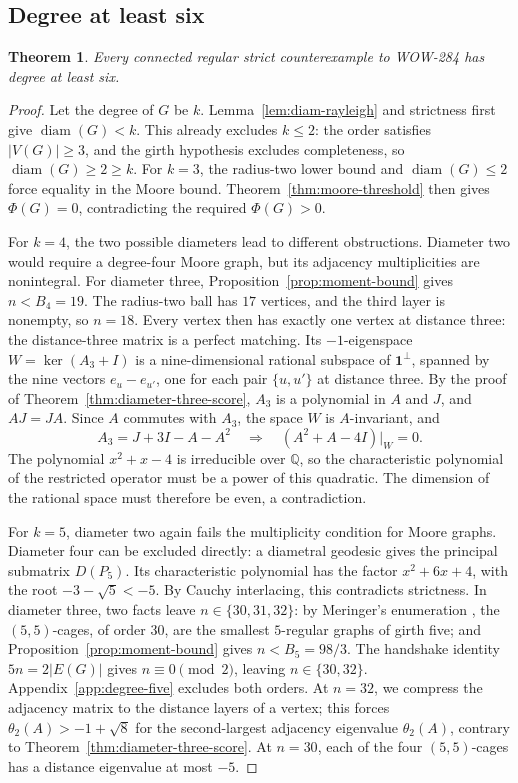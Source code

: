 \documentclass[a4paper,10pt,reqno]{amsart}
\theoremstyle{plain}
\newtheorem{theorem}{Theorem}[section]
\theoremstyle{definition}
\theoremstyle{remark}
\newcommand{\one}{\mathbf 1}
\newcommand{\diam}{\operatorname{diam}}
\begin{document}
\subsection{Degree at least six}

\begin{theorem}\label{thm:regular-degree-six}
Every connected regular strict counterexample to WOW-284 has degree at least
six.
\end{theorem}

\begin{proof}
Let the degree of \(G\) be \(k\). Lemma~\ref{lem:diam-rayleigh} and
strictness first give
\(\diam(G)<k\).  This already excludes \(k\le2\): the order satisfies
\(|V(G)|\ge3\), and the girth hypothesis excludes completeness, so
\(\diam(G)\ge2\ge k\).  For \(k=3\), the radius-two lower bound and
\(\diam(G)\le2\) force equality in the Moore bound.
Theorem~\ref{thm:moore-threshold} then gives \(\Phi(G)=0\), contradicting
the required \(\Phi(G)>0\).

For \(k=4\), the two possible diameters lead to different obstructions.
Diameter two would require a degree-four Moore graph, but its adjacency
multiplicities are nonintegral.  For diameter three,
Proposition~\ref{prop:moment-bound} gives \(n<B_4=19\).  The radius-two ball has
\(17\) vertices, and the third layer is nonempty, so \(n=18\).
Every vertex then has exactly one vertex at distance three: the
distance-three matrix is a perfect matching.
Its \(-1\)-eigenspace \(W=\ker(A_3+I)\) is a nine-dimensional rational
subspace of \(\one^\perp\), spanned by the nine vectors \(e_u-e_{u'}\), one
for each pair \(\{u,u'\}\) at distance three. By the proof of
Theorem~\ref{thm:diameter-three-score}, \(A_3\) is a polynomial in \(A\) and
\(J\), and \(AJ=JA\).  Since \(A\) commutes with \(A_3\), the space
\(W\) is \(A\)-invariant, and
\[
 A_3=J+3I-A-A^2
 \quad\Longrightarrow\quad
 (A^2+A-4I)|_W=0.
\]
The polynomial \(x^2+x-4\) is irreducible over \(\mathbb Q\), so the
characteristic polynomial of the restricted operator must be a power of this
quadratic. The dimension of the rational space must therefore be even, a
contradiction.

For \(k=5\), diameter two again fails the multiplicity condition for Moore
graphs.
Diameter four can be excluded directly: a diametral geodesic gives the
principal submatrix \(D(P_5)\). Its characteristic polynomial has the factor
\(x^2+6x+4\), with the root \(-3-\sqrt5<-5\). By Cauchy interlacing, this
contradicts strictness.  In diameter three, two facts leave
\(n\in\{30,31,32\}\): by Meringer's enumeration
\cite[p.~142]{Meringer1999}, the \((5,5)\)-cages, of order \(30\), are the
smallest \(5\)-regular graphs of girth five; and
Proposition~\ref{prop:moment-bound} gives \(n<B_5=98/3\).  The handshake
identity \(5n=2|E(G)|\) gives \(n\equiv0\pmod2\), leaving \(n\in\{30,32\}\).
Appendix~\ref{app:degree-five} excludes both orders. At \(n=32\), we compress
the adjacency matrix to the distance layers of a vertex; this forces
\(\theta_2(A)>-1+\sqrt8\) for the second-largest adjacency eigenvalue
\(\theta_2(A)\), contrary to Theorem~\ref{thm:diameter-three-score}. At
\(n=30\), each of the four \((5,5)\)-cages has a distance eigenvalue at most
\(-5\).
\end{proof}
\end{document}
